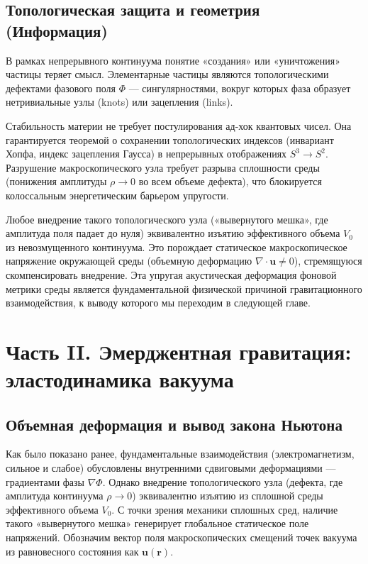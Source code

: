 \documentclass[12pt,a4paper]{article}
\begin{document}
	\subsection{Топологическая защита и геометрия (Информация)}
В рамках непрерывного континуума понятие «создания» или «уничтожения» частицы теряет смысл. Элементарные частицы являются топологическими дефектами фазового поля $\Phi$ — сингулярностями, вокруг которых фаза образует нетривиальные узлы (knots) или зацепления (links).

Стабильность материи не требует постулирования ад-хок квантовых чисел. Она гарантируется теоремой о сохранении топологических индексов (инвариант Хопфа, индекс зацепления Гаусса) в непрерывных отображениях $S^3 \to S^2$. Разрушение макроскопического узла требует разрыва сплошности среды (понижения амплитуды $\rho \to 0$ во всем объеме дефекта), что блокируется колоссальным энергетическим барьером упругости.

Любое внедрение такого топологического узла («вывернутого мешка», где амплитуда поля падает до нуля) эквивалентно изъятию эффективного объема $V_0$ из невозмущенного континуума. Это порождает статическое макроскопическое напряжение окружающей среды (объемную деформацию $\nabla \cdot \mathbf{u} \neq 0$), стремящуюся скомпенсировать внедрение. Эта упругая акустическая деформация фоновой метрики среды является фундаментальной физической причиной гравитационного взаимодействия, к выводу которого мы переходим в следующей главе.

\section{Часть II. Эмерджентная гравитация: эластодинамика вакуума}

\subsection{Объемная деформация и вывод закона Ньютона}
Как было показано ранее, фундаментальные взаимодействия (электромагнетизм, сильное и слабое) обусловлены внутренними сдвиговыми деформациями — градиентами фазы $\nabla \Phi$. Однако внедрение топологического узла (дефекта, где амплитуда континуума $\rho \to 0$) эквивалентно изъятию из сплошной среды эффективного объема $V_0$. 
С точки зрения механики сплошных сред, наличие такого «вывернутого мешка» генерирует глобальное статическое поле напряжений. Обозначим вектор поля макроскопических смещений точек вакуума из равновесного состояния как $\mathbf{u}(\mathbf{r})$.
\end{document}

